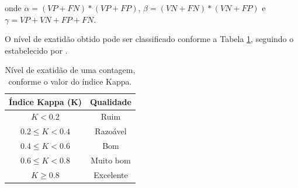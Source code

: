 \noindent onde $\alpha=(VP+FN)*(VP+FP)$, $\beta=(VN+FN)*(VN+FP)$ e $\gamma=VP+VN+FP+FN$.

O nível de exatidão obtido pode ser classificado conforme a Tabela \ref{tab:indice_kappa}, seguindo o estabelecido por \citeauthor{landis1977measurement} \citep{landis1977measurement}.

\begin{table}[ht]
  \caption{Nível de exatidão de uma contagem, conforme o valor do índice Kappa.}
  \label{tab:indice_kappa}
  \begin{center}
    \begin{tabular}{cc}
    \toprule
    \textbf{Índice Kappa (K)} & \textbf{Qualidade} \\
    \midrule
      $K < 0.2$ & Ruim \\
      $0.2 \leq K < 0.4$ & Razoável \\
      $0.4 \leq K < 0.6$ & Bom \\
      $0.6 \leq K < 0.8$ & Muito bom \\
      $K \geq 0.8$ & Excelente \\
    \bottomrule
    \end{tabular}
  \end{center}
\end{table}


